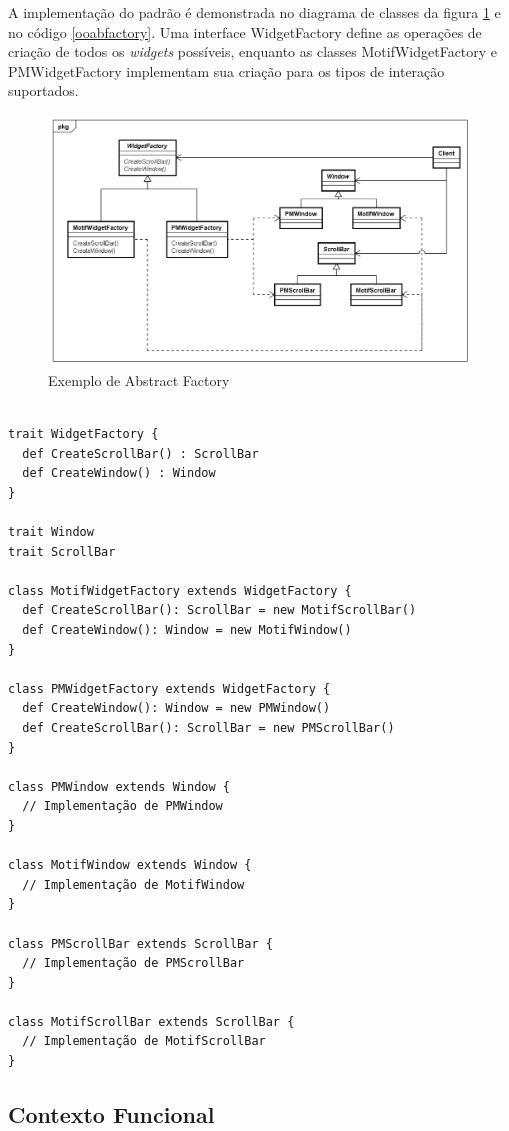 A implementação do padrão é demonstrada no 
diagrama de classes da figura \ref{abfactory_exemplo} 
e no código \ref{ooabfactory}. Uma interface 
WidgetFactory define as operações de criação 
de todos os \textit{widgets} possíveis, enquanto 
as classes MotifWidgetFactory e PMWidgetFactory 
implementam sua criação para os tipos de 
interação suportados.

\begin{figure}[htb]
	\caption{\label{abfactory_exemplo}Exemplo de Abstract Factory}
	\begin{center}
	    \includegraphics[scale=0.5]{5_padroes-contexto-funcional/5.1_criacionais/5.1.2_abstract-factory/abstractfactory_exemplo.png}
	\end{center}
\end{figure}

\begin{lstlisting}[caption={Abstract Factory Orientado a Objetos},label=ooabfactory]
	
trait WidgetFactory {
  def CreateScrollBar() : ScrollBar
  def CreateWindow() : Window
}

trait Window 
trait ScrollBar

class MotifWidgetFactory extends WidgetFactory {
  def CreateScrollBar(): ScrollBar = new MotifScrollBar()
  def CreateWindow(): Window = new MotifWindow()
}

class PMWidgetFactory extends WidgetFactory {
  def CreateWindow(): Window = new PMWindow()
  def CreateScrollBar(): ScrollBar = new PMScrollBar()
}

class PMWindow extends Window {
  // Implementação de PMWindow
}

class MotifWindow extends Window {
  // Implementação de MotifWindow
}

class PMScrollBar extends ScrollBar {
  // Implementação de PMScrollBar
}

class MotifScrollBar extends ScrollBar {
  // Implementação de MotifScrollBar
}

\end{lstlisting}



\subsection*{Contexto Funcional}

\begin{lstlisting}[caption={Abstract Factory Funcional},label=fpabfactory]
    
    

\end{lstlisting}